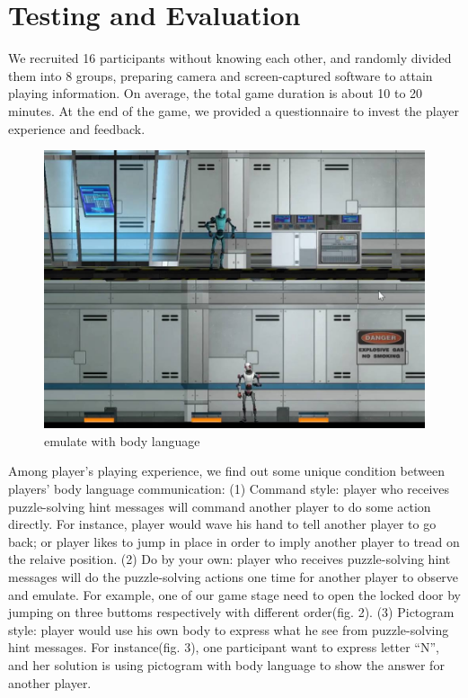\documentclass{chi-ext}
\begin{document}
\section{Testing and Evaluation}
We recruited 16 participants without knowing each other, and randomly divided them into 8 groups, preparing camera and screen-captured software to attain playing information. 
On average, the total game duration is about 10 to 20 minutes. 
At the end of the game, we provided a questionnaire to invest the player experience and feedback.

\begin{figure}
  \centering
  \includegraphics[width=0.8\linewidth]{figures/Figure2.jpg}
  \caption{emulate with body language}
  \label{fig:Figure2}
\end{figure}

Among player's playing experience, we find out some unique condition between players' body language communication: 
(1) Command style: player who receives puzzle-solving hint messages will command another player to do some action directly. For instance, player would wave his hand to tell another player to go back; or player likes to jump in place in order to imply another player to tread on the relaive position.
(2) Do by your own: player who receives puzzle-solving hint messages will do the puzzle-solving actions one time for another player to observe and emulate. For example, one of our game stage need to open the locked door by jumping on three buttoms respectively with different order(fig. 2).
(3) Pictogram style: player would use his own body to express what he see from puzzle-solving hint messages. For instance(fig. 3), one participant want to express letter ``N'', and her solution is using pictogram with body language to show the answer for another player.
\end{document}
